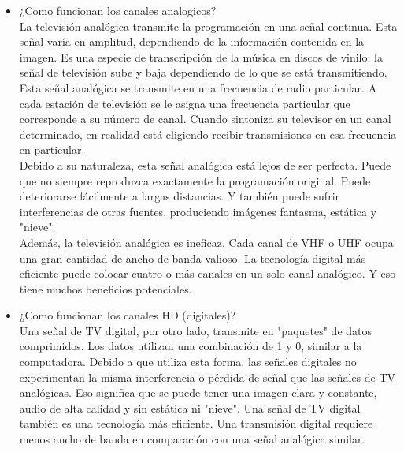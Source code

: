 \begin{itemize}
\item {\color{red} ¿Como funcionan los canales analogicos?}\\
La televisión analógica transmite la programación en una señal continua. Esta señal varía en amplitud, dependiendo de la información contenida en la imagen. Es una especie de transcripción de la música en discos de vinilo; la señal de televisión sube y baja dependiendo de lo que se está transmitiendo. \\
Esta señal analógica se transmite en una frecuencia de radio particular. A cada estación de televisión se le asigna una frecuencia particular que corresponde a su número de canal. Cuando sintoniza su televisor en un canal determinado, en realidad está eligiendo recibir transmisiones en esa frecuencia en particular. \\
Debido a su naturaleza, esta señal analógica está lejos de ser perfecta. Puede que no siempre reproduzca exactamente la programación original. Puede deteriorarse fácilmente a largas distancias. Y también puede sufrir interferencias de otras fuentes, produciendo imágenes fantasma, estática y "nieve".\\ Además, la televisión analógica es ineficaz. Cada canal de VHF o UHF ocupa una gran cantidad de ancho de banda valioso. La tecnología digital más eficiente puede colocar cuatro o más canales en un solo canal analógico. Y eso tiene muchos beneficios potenciales.
\item {\color{red} ¿Como funcionan los canales HD (digitales)? }\\
Una señal de TV digital, por otro lado, transmite en "paquetes" de datos comprimidos. Los datos utilizan una combinación de 1 y 0, similar a la computadora. Debido a que utiliza esta forma, las señales digitales no experimentan la misma interferencia o pérdida de señal que las señales de TV analógicas. Eso significa que se puede tener una imagen clara y constante, audio de alta calidad y sin estática ni "nieve". Una señal de TV digital también es una tecnología más eficiente. Una transmisión digital requiere menos ancho de banda en comparación con una señal analógica similar.
\end{itemize}

